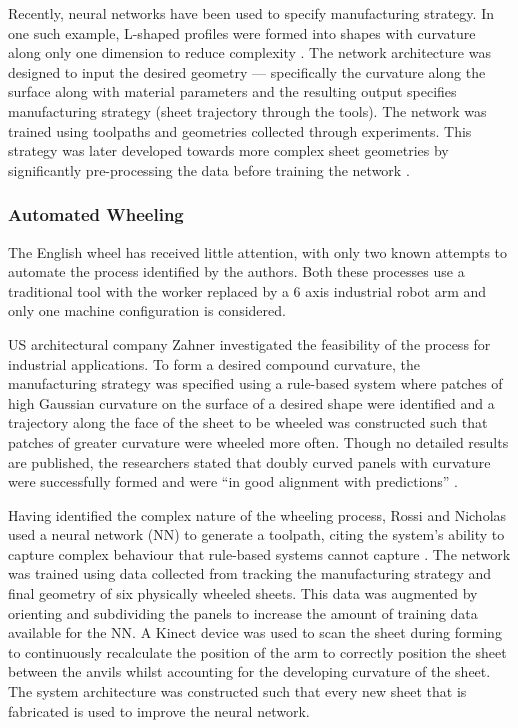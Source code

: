 Recently, neural networks have been used to specify manufacturing strategy. In one such example, L-shaped profiles were formed into shapes with curvature along only one dimension to reduce complexity \citep{Opritescu2015AutomatedApproach}. The network architecture was designed to input the desired geometry --- specifically the curvature along the surface along with material parameters and the resulting output specifies manufacturing strategy (sheet trajectory through the tools). The network was trained using toolpaths and geometries collected through experiments. This strategy was later developed towards more complex sheet geometries by significantly pre-processing the data before training the network \citep{Hartmann2019AnFree-forming}.

\subsubsection{Automated Wheeling} \label{sec:MechEW}
The English wheel has received little attention, with only two known attempts to automate the process identified by the authors. Both these processes use a traditional tool with the worker replaced by a 6 axis industrial robot arm and only one machine configuration is considered. 

US architectural company Zahner investigated the feasibility of the process for industrial applications. To form a desired compound curvature, the manufacturing strategy was specified using a rule-based system where patches of high Gaussian curvature on the surface of a desired shape were identified and a trajectory along the face of the sheet to be wheeled was constructed such that patches of greater curvature were wheeled more often. Though no detailed results are published, the researchers stated that doubly curved panels with curvature were successfully formed and were ``in good alignment with predictions'' \citep{Vazquez2017RoboticWheeling}. 

Having identified the complex nature of the wheeling process, Rossi and Nicholas used a neural network (NN) to generate a toolpath, citing the system's ability to capture complex behaviour that rule-based systems cannot capture \citep{Rossi2018ModellingWheel, Rossi2018Re/LearningSurfaces}. The network was trained using data collected from tracking the manufacturing strategy and final geometry of six physically wheeled sheets. This data was augmented by orienting and subdividing the panels to increase the amount of training data available for the NN. A Kinect device was used to scan the sheet during forming to continuously recalculate the position of the arm to correctly position the sheet between the anvils whilst accounting for the developing curvature of the sheet. The system architecture was constructed such that every new sheet that is fabricated is used to improve the neural network.


